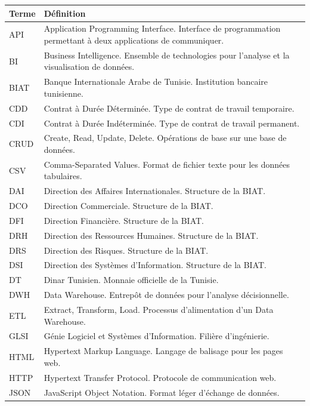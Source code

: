 \begin{longtable}{|p{3cm}|p{11cm}|}
\hline
\textbf{Terme} & \textbf{Définition} \\
\hline
API & Application Programming Interface. Interface de programmation permettant à deux applications de communiquer. \\
\hline
BI & Business Intelligence. Ensemble de technologies pour l'analyse et la visualisation de données. \\
\hline
BIAT & Banque Internationale Arabe de Tunisie. Institution bancaire tunisienne. \\
\hline
CDD & Contrat à Durée Déterminée. Type de contrat de travail temporaire. \\
\hline
CDI & Contrat à Durée Indéterminée. Type de contrat de travail permanent. \\
\hline
CRUD & Create, Read, Update, Delete. Opérations de base sur une base de données. \\
\hline
CSV & Comma-Separated Values. Format de fichier texte pour les données tabulaires. \\
\hline
DAI & Direction des Affaires Internationales. Structure de la BIAT. \\
\hline
DCO & Direction Commerciale. Structure de la BIAT. \\
\hline
DFI & Direction Financière. Structure de la BIAT. \\
\hline
DRH & Direction des Ressources Humaines. Structure de la BIAT. \\
\hline
DRS & Direction des Risques. Structure de la BIAT. \\
\hline
DSI & Direction des Systèmes d'Information. Structure de la BIAT. \\
\hline
DT & Dinar Tunisien. Monnaie officielle de la Tunisie. \\
\hline
DWH & Data Warehouse. Entrepôt de données pour l'analyse décisionnelle. \\
\hline
ETL & Extract, Transform, Load. Processus d'alimentation d'un Data Warehouse. \\
\hline
GLSI & Génie Logiciel et Systèmes d'Information. Filière d'ingénierie. \\
\hline
HTML & Hypertext Markup Language. Langage de balisage pour les pages web. \\
\hline
HTTP & Hypertext Transfer Protocol. Protocole de communication web. \\
\hline
JSON & JavaScript Object Notation. Format léger d'échange de données. \\

\end{longtable}

